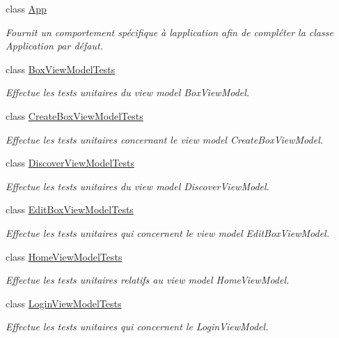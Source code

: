 \begin{DoxyCompactItemize}
\item 
class \hyperlink{class_boxes_1_1_tests_1_1_app}{App}
\begin{DoxyCompactList}\small\item\em Fournit un comportement spécifique à l\textquotesingle{}application afin de compléter la classe Application par défaut. \end{DoxyCompactList}\item 
class \hyperlink{class_boxes_1_1_tests_1_1_box_view_model_tests}{Box\+View\+Model\+Tests}
\begin{DoxyCompactList}\small\item\em Effectue les tests unitaires du view model Box\+View\+Model. \end{DoxyCompactList}\item 
class \hyperlink{class_boxes_1_1_tests_1_1_create_box_view_model_tests}{Create\+Box\+View\+Model\+Tests}
\begin{DoxyCompactList}\small\item\em Effectue les tests unitaires concernant le view model Create\+Box\+View\+Model. \end{DoxyCompactList}\item 
class \hyperlink{class_boxes_1_1_tests_1_1_discover_view_model_tests}{Discover\+View\+Model\+Tests}
\begin{DoxyCompactList}\small\item\em Effectue les tests unitaires du view model Discover\+View\+Model. \end{DoxyCompactList}\item 
class \hyperlink{class_boxes_1_1_tests_1_1_edit_box_view_model_tests}{Edit\+Box\+View\+Model\+Tests}
\begin{DoxyCompactList}\small\item\em Effectue les tests unitaires qui concernent le view model Edit\+Box\+View\+Model. \end{DoxyCompactList}\item 
class \hyperlink{class_boxes_1_1_tests_1_1_home_view_model_tests}{Home\+View\+Model\+Tests}
\begin{DoxyCompactList}\small\item\em Effectue les tests unitaires relatifs au view model Home\+View\+Model. \end{DoxyCompactList}\item 
class \hyperlink{class_boxes_1_1_tests_1_1_login_view_model_tests}{Login\+View\+Model\+Tests}
\begin{DoxyCompactList}\small\item\em Effectue les tests unitaires qui concernent le Login\+View\+Model. \end{DoxyCompactList}\item 

\end{DoxyCompactItemize}
